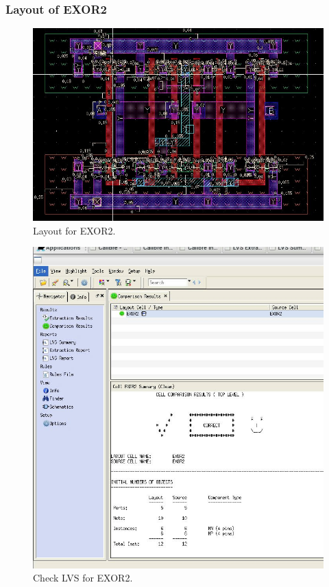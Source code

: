 \subsubsection{Layout of EXOR2}

\begin{figure}[H]
	\centering
	\includegraphics[width=.7\linewidth]{section/EX1/EXOR/EX1_EXOR2_layout.png}
	\caption{Layout for EXOR2.}
	\label{f_EX1_EXOR_layout}
\end{figure}

\begin{figure}[H]
	\centering
	\includegraphics[width=.7\linewidth]{section/EX1/EXOR/EX1_EXOR2_LVS_check.png}
	\caption{Check LVS for EXOR2.}
	\label{f_EX1_EXOR_LVS_check}
\end{figure}